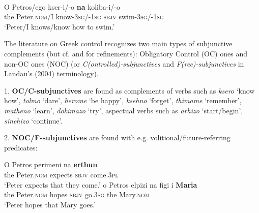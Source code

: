 \documentclass[output=paper]{langsci/langscibook}
\begin{document}
\ea%
 \label{ex:alexiadou:3}
\\
\gll O  Petros/ego  kser-i/-o        \textbf{na}    koliba-i/-o\\
  the    Peter.\textsc{nom}/I  know-\textsc{3sg}/-\textsc{1sg}    \textsc{sbjv}  swim-\textsc{3sg}/-\textsc{1sg}\\
\glt  ‘Peter/I knows/know how to swim.’
\z

The literature on Greek control recognizes two main types of subjunctive complements (but cf. \citealt{Spyropoulos2007a} and \citealt{Roussou2009} for refinements): Obligatory Control (OC) ones and non-OC ones (NOC) (or \textit{C(ontrolled)-subjunctives} and \textit{F(ree)-subjunctives} in Landau's (2004) terminology).


1. \textbf{OC/C-subjunctives} are found as complements of verbs such as \textit{ksero} ‘know how’, \textit{tolmo} ‘dare’, \textit{herome} ‘be happy’, \textit{ksehno} ‘forget’, \textit{thimame} ‘remember’, \textit{matheno} ‘learn’, \textit{dokimazo} ‘try’, aspectual verbs such as \textit{arhizo} ‘start/begin’, \textit{sinehizo} ‘continue’.



\ea%
    \label{ex:alexiadou:4}
\z
\z



2. \textbf{NOC/F-subjunctives} are found with e.g. volitional/future-referring predicates:



\ea%
    \label{ex:alexiadou:5}
    \ea\gll O    Petros      perimeni  na    \textbf{erthun}\\
       the    Peter.\textsc{nom} expects  \textsc{sbjv}  come.\textsc{3pl}\\
        \glt ‘Peter expects that they come.’
     \ex\gll  o     Petros    elpizi  na    figi     i     \textbf{Maria}\\
          the    Peter.\textsc{nom}   hopes  \textsc{sbjv}  go.\textsc{3sg}  the    Mary.\textsc{nom}\\
         \glt ‘Peter hopes that Mary goes.’
\z
\z
\end{document}
